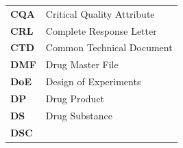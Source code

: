 \documentclass[
  11pt,
  a4paper,
]{report}
\begin{document}
\begin{longtable}[]{@{}ll@{}}
\begin{minipage}[t]{0.33\columnwidth}
\textbf{CQA}\strut
\end{minipage} & \begin{minipage}[t]{0.61\columnwidth}\raggedright
Critical Quality Attribute\strut
\end{minipage}\tabularnewline
\begin{minipage}[t]{0.33\columnwidth}\raggedright
\textbf{CRL}\strut
\end{minipage} & \begin{minipage}[t]{0.61\columnwidth}\raggedright
Complete Response Letter\strut
\end{minipage}\tabularnewline
\begin{minipage}[t]{0.33\columnwidth}\raggedright
\textbf{CTD}\strut
\end{minipage} & \begin{minipage}[t]{0.61\columnwidth}\raggedright
Common Technical Document\strut
\end{minipage}\tabularnewline
\begin{minipage}[t]{0.33\columnwidth}\raggedright
\textbf{DMF}\strut
\end{minipage} & \begin{minipage}[t]{0.61\columnwidth}\raggedright
Drug Master File\strut
\end{minipage}\tabularnewline
\begin{minipage}[t]{0.33\columnwidth}\raggedright
\textbf{DoE}\strut
\end{minipage} & \begin{minipage}[t]{0.61\columnwidth}\raggedright
Design of Experiments\strut
\end{minipage}\tabularnewline
\begin{minipage}[t]{0.33\columnwidth}\raggedright
\textbf{DP}\strut
\end{minipage} & \begin{minipage}[t]{0.61\columnwidth}\raggedright
Drug Product\strut
\end{minipage}\tabularnewline
\begin{minipage}[t]{0.33\columnwidth}\raggedright
\textbf{DS}\strut
\end{minipage} & \begin{minipage}[t]{0.61\columnwidth}\raggedright
Drug Substance\strut
\end{minipage}\tabularnewline
\begin{minipage}[t]{0.33\columnwidth}\raggedright
\textbf{DSC}\strut
\end{minipage} & \begin{minipage}[t]{0.61\columnwidth}\raggedright

\end{minipage}
\end{longtable}
\end{document}
